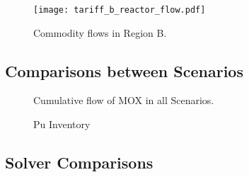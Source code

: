 \begin{figure}
  \begin{center}
    \texttt{[image: tariff\_b\_reactor\_flow.pdf]}
    \caption[]{
      \label{fig:prefs}
      Commodity flows in Region B.}
  \end{center}
\end{figure}

\subsection{Comparisons between Scenarios}

\begin{figure}
  \centering
  \begin{minipage}{\textwidth}
    \centering
  \end{minipage}%
  \caption[]{
    \label{fig:prefs}
    Cumulative flow of MOX in all Scenarios.}
\end{figure}

\begin{figure}
  \centering
  \begin{minipage}{0.5\columnwidth}
    \centering
    \vfill
  \end{minipage}%
  \begin{minipage}{0.5\columnwidth}
    \centering
    \vfill
  \end{minipage}
  \caption{Pu Inventory}\label{foo}
\end{figure}

\subsection{Solver Comparisons}

